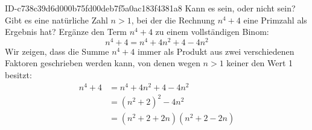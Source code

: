 \begin{exercise}
      {ID-c738c39d6d000b75fd00deb7f5a0ac183f4381a8}
      {Kann es sein, oder nicht sein?}
  \ifproblem\problem
    Gibt es eine natürliche Zahl $n>1$, bei der die Rechnung $n^{4}+4$ eine
    Primzahl als Ergebnis hat?
  \fi
  \ifoutline\outline
    Ergänze den Term $n^{4}+4$ zu einem vollständigen Binom:
    \begin{equation*}
      n^{4}+4=n^{4}+4n^{2}+4-4n^{2}
    \end{equation*}
  \fi
  \ifoutcome\outcome
    Wir zeigen, dass die Summe $n^{4}+4$ immer als Produkt aus
    zwei verschiedenen Faktoren geschrieben werden kann, von denen
    wegen $n>1$ keiner den Wert 1 besitzt:
    \begin{equation*}
      \begin{split}
        n^{4}+4&=n^{4}+4n^{2}+4-4n^{2}\\
               &=\left(n^{2}+2\right)^{2}-4n^{2}\\
               &=\left(n^{2}+2+2n\right)\left(n^{2}+2-2n\right)
      \end{split}
    \end{equation*}
  \fi
\end{exercise}
